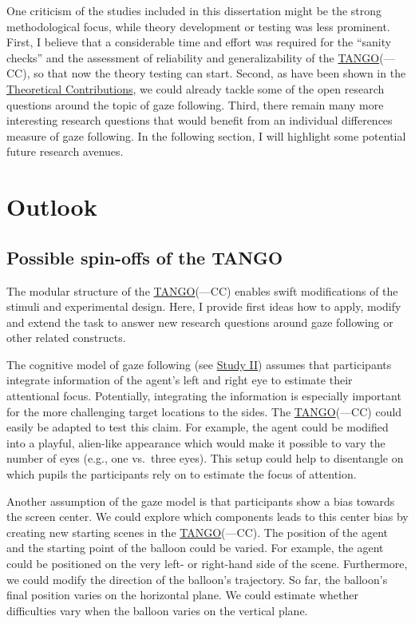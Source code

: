 \documentclass[
]{scrbook}
\begin{document}
One criticism of the studies included in this dissertation might be the strong methodological focus, while theory development or testing was less prominent. First, I believe that a considerable time and effort was required for the ``sanity checks'' and the assessment of reliability and generalizability of the \hyperref[acronyms_TANGO]{TANGO}(---CC), so that now the theory testing can start. Second, as have been shown in the \hyperref[theoreticalcontributions]{Theoretical Contributions}, we could already tackle some of the open research questions around the topic of gaze following. Third, there remain many more interesting research questions that would benefit from an individual differences measure of gaze following. In the following section, I will highlight some potential future research avenues.

\section{Outlook}\label{outlook}

\subsection{Possible spin-offs of the TANGO}\label{possible-spin-offs-of-the-tango}

The modular structure of the \hyperref[acronyms_TANGO]{TANGO}(---CC) enables swift modifications of the stimuli and experimental design. Here, I provide first ideas how to apply, modify and extend the task to answer new research questions around gaze following or other related constructs.

The cognitive model of gaze following (see \hyperref[studyII]{Study II}) assumes that participants integrate information of the agent's left and right eye to estimate their attentional focus. Potentially, integrating the information is especially important for the more challenging target locations to the sides. The \hyperref[acronyms_TANGO]{TANGO}(---CC) could easily be adapted to test this claim. For example, the agent could be modified into a playful, alien-like appearance which would make it possible to vary the number of eyes (e.g., one vs.~three eyes). This setup could help to disentangle on which pupils the participants rely on to estimate the focus of attention.

Another assumption of the gaze model is that participants show a bias towards the screen center. We could explore which components leads to this center bias by creating new starting scenes in the \hyperref[acronyms_TANGO]{TANGO}(---CC). The position of the agent and the starting point of the balloon could be varied. For example, the agent could be positioned on the very left- or right-hand side of the scene. Furthermore, we could modify the direction of the balloon's trajectory. So far, the balloon's final position varies on the horizontal plane. We could estimate whether difficulties vary when the balloon varies on the vertical plane.
\end{document}
